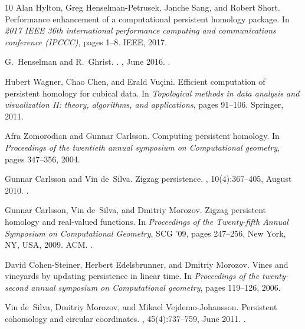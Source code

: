 \documentclass[10pt,a4paper]{article}
\begin{document}
\begin{thebibliography}{10}
Alan Hylton, Greg Henselman-Petrusek, Janche Sang, and Robert Short.
\newblock Performance enhancement of a computational persistent homology package.
\newblock In {\em 2017 IEEE 36th international performance computing and communications conference (IPCCC)}, pages 1--8. IEEE, 2017.

G.~{Henselman} and R.~{Ghrist}.
.
, June 2016.
\newblock \href {https://arxiv.org/abs/1606.00199} {}.

Hubert Wagner, Chao Chen, and Erald Vu{\c{c}}ini.
\newblock Efficient computation of persistent homology for cubical data.
\newblock In {\em Topological methods in data analysis and visualization II: theory, algorithms, and applications}, pages 91--106. Springer, 2011.

Afra Zomorodian and Gunnar Carlsson.
\newblock Computing persistent homology.
\newblock In {\em Proceedings of the twentieth annual symposium on Computational geometry}, pages 347--356, 2004.

Gunnar Carlsson and Vin de~Silva.
\newblock Zigzag persistence.
, 10(4):367--405, August 2010.
\newblock \href {https://doi.org/10.1007/s10208-010-9066-0} {}.

Gunnar Carlsson, Vin de~Silva, and Dmitriy Morozov.
\newblock Zigzag persistent homology and real-valued functions.
\newblock In {\em Proceedings of the Twenty-fifth Annual Symposium on Computational Geometry}, SCG '09, pages 247--256, New York, NY, USA, 2009. ACM.
\newblock \href {https://doi.org/10.1145/1542362.1542408} {}.

David Cohen-Steiner, Herbert Edelsbrunner, and Dmitriy Morozov.
\newblock Vines and vineyards by updating persistence in linear time.
\newblock In {\em Proceedings of the twenty-second annual symposium on Computational geometry}, pages 119--126, 2006.

Vin de~Silva, Dmitriy Morozov, and Mikael Vejdemo-Johansson.
\newblock Persistent cohomology and circular coordinates.
, 45(4):737--759, June 2011.
\newblock \href {https://doi.org/10.1007/s00454-011-9344-x} {}.


\end{thebibliography}
\end{document}

